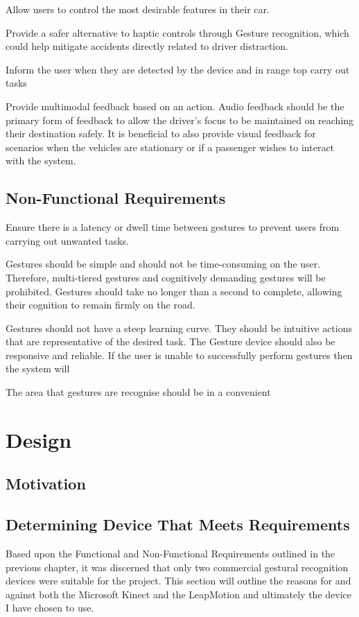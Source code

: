 \documentclass{l4proj}
\begin{document}
Allow users to control the most desirable features in their car.

Provide a safer alternative to haptic controls through Gesture recognition, which could help mitigate accidents directly related to driver distraction.

Inform the user when they are detected by the device and in range top carry out tasks

Provide multimodal feedback based on an action. Audio feedback should be the primary form of feedback to allow the driver's focus to be maintained on reaching their destination safely. It is beneficial to also provide visual feedback for scenarios when the vehicles are stationary or if a passenger wishes to interact with the system.   

\section{Non-Functional Requirements}
\vspace{-3mm}
Ensure there is a latency or dwell time between gestures to prevent users from carrying out unwanted tasks.

Gestures should be simple and should not be time-consuming on the user. Therefore, multi-tiered gestures and cognitively demanding gestures will be prohibited. Gestures should take no longer than a second to complete, allowing their cognition to remain firmly on the road.

Gestures should not have a steep learning curve. They should be intuitive actions that are representative of the desired task. The Gesture device should also be responsive and reliable. If the user is unable to successfully perform gestures then the system will 

The area that gestures are recognise should be in a convenient 

\chapter{Design}
\label{sec:design}
\vspace{-3mm}
\section{Motivation}
\vspace{-3mm}
\section{Determining Device That Meets Requirements}
\vspace{-3mm}
Based upon the Functional and Non-Functional Requirements outlined in the previous chapter, it was discerned that only two commercial gestural recognition devices were suitable for the project. This section will outline the reasons for and against both the Microsoft Kinect and the LeapMotion and ultimately the device I have chosen to use.
\end{document}
